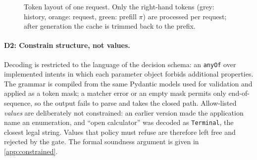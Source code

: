 \documentclass[10pt,twocolumn,letterpaper]{article}
\theoremstyle{definition}
\begin{document}
\begin{figure}[t]
\centering
{}
\caption{Token layout of one request. Only the right-hand tokens (grey: history, orange: request, green: prefill $\pi$) are processed per request; after generation the cache is trimmed back to the prefix.}
\label{fig:prompt}
\end{figure}

\paragraph{D2: Constrain structure, not values.}
Decoding is restricted to the language of the decision schema: an \texttt{anyOf} over implemented
intents in which each parameter object forbids additional properties. The grammar is compiled from
the same Pydantic models used for validation and applied as a token mask; a matcher error or an
empty mask permits only end-of-sequence, so the output fails to parse and takes the closed path.
Allow-listed \emph{values} are deliberately not constrained: an earlier version made the application
name an enumeration, and ``open calculator'' was decoded as \texttt{Terminal}, the closest legal
string. Values that policy must refuse are therefore left free and rejected by the gate. The formal
soundness argument is given in \cref{app:constrained}.
\end{document}
